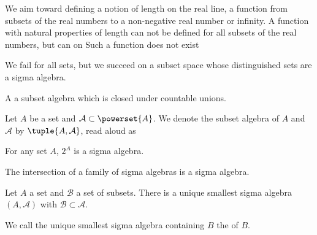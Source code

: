 
\sbasic



\sstart



We aim toward defining
a notion of length on the
real line, a function from
subsets of the real numbers
to a non-negative real number
or infinity.
A function with natural properties
of length can not be defined
for all subsets of the real numbers,
but can on
Such a function does not exist

We fail for all sets,
but we succeed on a
subset space whose distinguished
sets are a sigma algebra.


A 
a subset algebra which is closed
under countable unions.


Let $A$ be a set and $\mathcal{A} \subset \powerset{A}$.
We denote the subset algebra of $A$ and $\mathcal{A}$
by $\tuple{A, \mathcal{A}}$, read aloud as 


\begin{prop}
  For any set $A$, $2^{A}$ is a sigma algebra.
\end{prop}

\begin{prop}
  The intersection of a family of sigma algebras is
  a sigma algebra.
  \label{sigma_algebra:sigmaintersection}
\end{prop}


\begin{prop}
  Let $A$ a set and $\mathcal{B}$ a set of subsets.
  There is a unique smallest sigma algebra
  $(A, \mathcal{A})$ with
  $\mathcal{B} \subset \mathcal{A}$.
\end{prop}

We call the unique smallest sigma algebra
containing $B$ the
of $B$.

\strats
